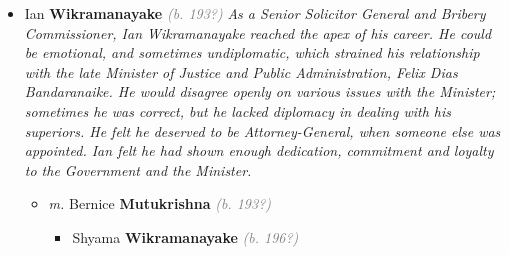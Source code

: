 \documentclass[10pt, openany]{book}
\begin{document}
\begin{itemize}
{\begin{itemize}
{\begin{itemize}
{\begin{itemize}
{\begin{itemize}
{\begin{itemize}
{\begin{itemize}
{\begin{itemize}
\item{Victoria David \textbf{Wikramanayake} \textcolor{gray}{\textit{(b. 203?)}}
  }
\item{Raffael David \textbf{Wikramanayake} \textcolor{gray}{\textit{(b. 203?)}}
  }
\end{itemize}}
\end{itemize}
  }
\end{itemize}}
\item{\textit{m.} Unknown \textbf{Bear} \textcolor{gray}{\textit{(b. 197?)}}   \label{couple:00003958:00003964} \begin{itemize}
\item{Thiebo \textbf{Wikramanayake} \textcolor{gray}{\textit{(b. 200?)}}
 }
\end{itemize}}
\end{itemize}
  }
\item{Sunetra \textbf{Wikramanayake} \textcolor{gray}{\textit{(b. 197?)}}
 }
\item{Yamellie \textbf{Wikramanayake} \textcolor{gray}{\textit{(b. 197?)}}
 }
\end{itemize}}
\end{itemize}
  }
\item{Ian \textbf{Wikramanayake} \textcolor{gray}{\textit{(b. 193?)}} \textcolor{slmaroon}{\textit{As a Senior Solicitor General and Bribery Commissioner, Ian Wikramanayake reached the apex of his career. He could be emotional, and sometimes undiplomatic, which strained his relationship with the late Minister of Justice and Public Administration, Felix Dias Bandaranaike. He would disagree openly on various issues with the Minister; sometimes he was correct, but he lacked diplomacy in dealing with his superiors. He felt he deserved to be Attorney-General, when someone else was appointed. Ian felt he had shown enough dedication, commitment and loyalty to the Government and the Minister.}}
\begin{itemize}
\item{\textit{m.} Bernice \textbf{Mutukrishna} \textcolor{gray}{\textit{(b. 193?)}}   \label{couple:00003968:00003969} \begin{itemize}
\item{Shyama \textbf{Wikramanayake} \textcolor{gray}{\textit{(b. 196?)}}
}
\end{itemize}}
\end{itemize}}
\end{itemize}}
\end{itemize}
\end{document}
